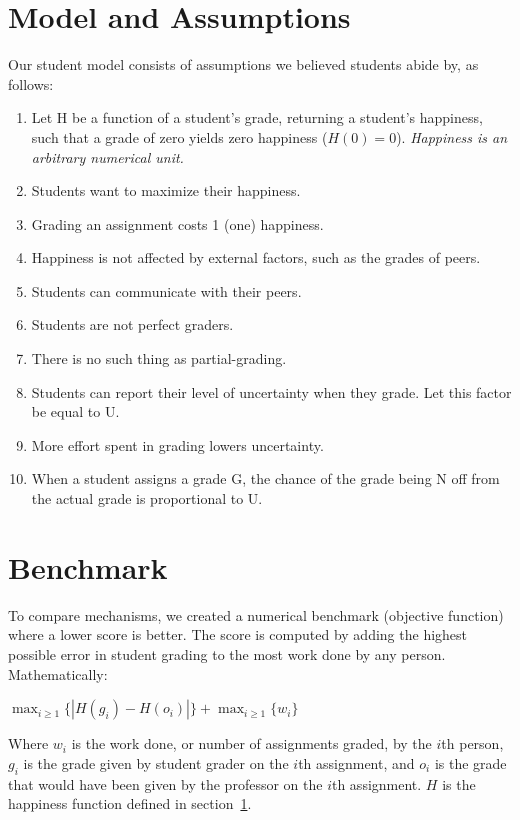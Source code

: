 \documentclass{sigchi}
\begin{document}
\section{Model and Assumptions}
\label{sec:modelandassumptions}
Our student model consists of assumptions we believed students abide by, as follows:
\begin{enumerate}
  \item Let H be a function of a student's grade, returning a student's happiness, such that a grade of zero yields zero happiness ($H(0)=0$). \newline \textit{Happiness is an arbitrary numerical unit.}
  \item Students want to maximize their happiness.
  \item Grading an assignment costs 1 (one) happiness.
  \item Happiness is not affected by external factors, such as the grades of peers.
  \item Students can communicate with their peers.
  \item Students are not perfect graders.
  \item There is no such thing as partial-grading.
  \item Students can report their level of uncertainty when they grade. Let this factor be equal to U.
  \item More effort spent in grading lowers uncertainty.
  \item When a student assigns a grade G, the chance of the grade being N off from the actual grade is proportional to U.
\end{enumerate}

\section{Benchmark}

To compare mechanisms, we created a numerical benchmark (objective function) where a lower score is better. The score is computed by adding the highest possible error in student grading to the most work done by any person. Mathematically:

$\max_{i \ge 1} \{|H(g_i)-H(o_i)|\} + \max_{i \ge 1} \{w_i\}$

Where $w_i$ is the work done, or number of assignments graded, by the $i$th person, $g_i$ is the grade given by student grader on the $i$th assignment, and $o_i$ is the grade that would have been given by the professor on the $i$th assignment. $H$ is the happiness function defined in section~\ref{sec:modelandassumptions}.
\end{document}
